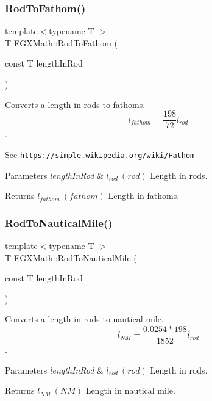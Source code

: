 \subsubsection{\texorpdfstring{Rod\+To\+Fathom()}{RodToFathom()}}
{\footnotesize\ttfamily template$<$typename T $>$ \\
T E\+G\+X\+Math\+::\+Rod\+To\+Fathom (\begin{DoxyParamCaption}\item[{const T}]{length\+In\+Rod }\end{DoxyParamCaption})}



Converts a length in rods to fathoms. \[ l_{fathom}= \frac{198}{72} l_{rod} \]. 

See \href{https://simple.wikipedia.org/wiki/Fathom}{\tt https\+://simple.\+wikipedia.\+org/wiki/\+Fathom} 
\begin{DoxyParams}{Parameters}
{\em length\+In\+Rod} & $ l_{rod}\ (rod)$ Length in rods. \\
\hline
\end{DoxyParams}
\begin{DoxyReturn}{Returns}
$ l_{fathom}\ (fathom)$ Length in fathoms. 
\end{DoxyReturn}
\mbox{\label{group___e_g_x_math-_conversions-_length_conversions-_imperial-_rod-_nautical_ga68825640131c61e55490acfcb616aa78}} 
\subsubsection{\texorpdfstring{Rod\+To\+Nautical\+Mile()}{RodToNauticalMile()}}
{\footnotesize\ttfamily template$<$typename T $>$ \\
T E\+G\+X\+Math\+::\+Rod\+To\+Nautical\+Mile (\begin{DoxyParamCaption}\item[{const T}]{length\+In\+Rod }\end{DoxyParamCaption})}



Converts a length in rods to nautical mile. \[ l_{NM}= \frac{0.0254 * 198}{1852} l_{rod} \]. 


\begin{DoxyParams}{Parameters}
{\em length\+In\+Rod} & $ l_{rod}\ (rod)$ Length in rods. \\
\hline
\end{DoxyParams}
\begin{DoxyReturn}{Returns}
$ l_{NM}\ (NM)$ Length in nautical mile. 
\end{DoxyReturn}
